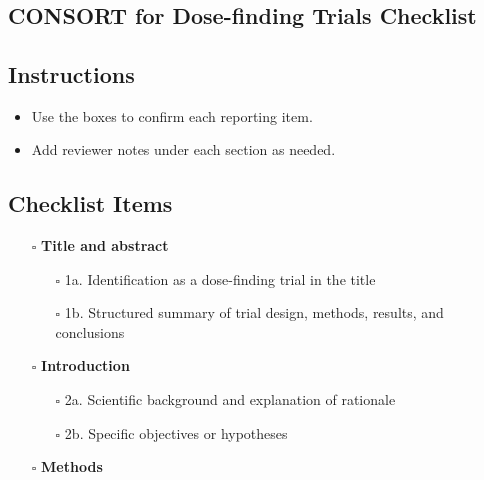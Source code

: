 \documentclass[11pt]{article}
\def\tightlist{}
\begin{document}
\begin{center}
{\LARGE }\\[4pt]
\normalsize 
\end{center}
\vspace{1em}

\begin{Form}

\section{CONSORT for Dose-finding Trials
Checklist}\label{consort-for-dose-finding-trials-checklist}

\subsection{Instructions}\label{instructions}

\begin{itemize}
\tightlist
\item
  Use the boxes to confirm each reporting item.
\item
  Add reviewer notes under each section as needed.
\end{itemize}

\subsection{Checklist Items}\label{checklist-items}

\begin{itemize}
\tightlist
\item[$\square$]
  \textbf{Title and abstract}

  \begin{itemize}
  \tightlist
  \item[$\square$]
    1a. Identification as a dose-finding trial in the title
  \item[$\square$]
    1b. Structured summary of trial design, methods, results, and
    conclusions
  \end{itemize}
\item[$\square$]
  \textbf{Introduction}

  \begin{itemize}
  \tightlist
  \item[$\square$]
    2a. Scientific background and explanation of rationale
  \item[$\square$]
    2b. Specific objectives or hypotheses
  \end{itemize}
\item[$\square$]
  \textbf{Methods}


\end{itemize}
\end{Form}
\end{document}
